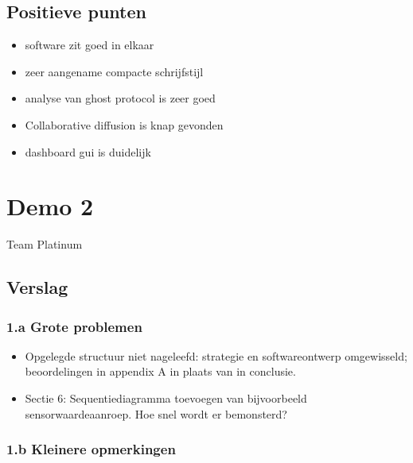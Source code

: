 \documentclass[12pt,a4paper]{report}
\begin{document}
\subsection{ Positieve punten}

\begin{itemize}
 \item software zit goed in elkaar
 \item zeer aangename compacte schrijfstijl
 \item analyse van ghost protocol is zeer goed
 \item Collaborative diffusion is knap gevonden
 \item dashboard gui is duidelijk
\end{itemize}

\section{Demo 2}
\begin{center}
Team Platinum
\end{center}

\subsection{ Verslag} 
     
     \subsubsection{1.a Grote problemen}

\begin{itemize}
	\item    Opgelegde structuur niet nageleefd: strategie en softwareontwerp omgewisseld;
 beoordelingen in appendix A in plaats van in conclusie.
\item Sectie 6: Sequentiediagramma toevoegen van bijvoorbeeld sensorwaardeaanroep. Hoe snel wordt er bemonsterd?
\end{itemize}

   \subsubsection{1.b Kleinere opmerkingen}
\end{document}
